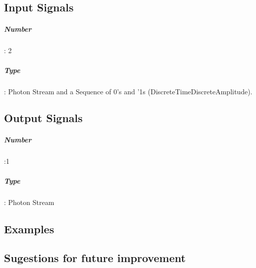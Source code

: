 \subsection*{Input Signals}
\subparagraph*{Number}: 2
\subparagraph*{Type}: Photon Stream and a Sequence of 0's and '1s (DiscreteTimeDiscreteAmplitude).

\subsection*{Output Signals}
\subparagraph*{Number}:1
\subparagraph*{Type}: Photon Stream

\subsection*{Examples}


\subsection*{Sugestions for future improvement} 